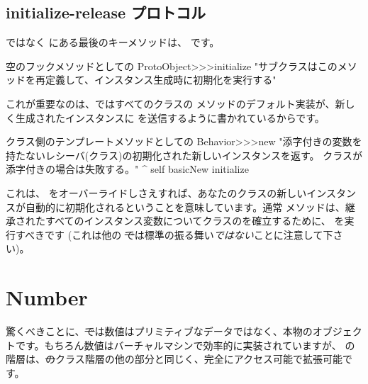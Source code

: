 \documentclass[a4paper,10pt,twoside]{book}
\begin{document}

\subsection{initialize-release プロトコル}

 ではなく  にある最後のキーメソッドは、 です。

\begin{method}{空のフックメソッドとしての }
ProtoObject>>>initialize
   "サブクラスはこのメソッドを再定義して、インスタンス生成時に初期化を実行する"
\end{method}

これが重要なのは、\pharo ではすべてのクラスの  メソッドのデフォルト実装が、新しく生成されたインスタンスに  を送信するように書かれているからです。

\begin{method}{クラス側のテンプレートメソッドとしての }
Behavior>>>new
    "添字付きの変数を持たないレシーバ(クラス)の初期化された新しいインスタンスを返す。
    クラスが添字付きの場合は失敗する。"
    ^ self basicNew initialize
\end{method} %

これは、 をオーバーライドしさえすれば、あなたのクラスの新しいインスタンスが自動的に初期化されるということを意味しています。通常  メソッドは、継承されたすべてのインスタンス変数についてクラスのを確立するために、 を実行すべきです
(これは他の \st では標準の振る舞い\emph{ではない}ことに注意して下さい)。%

\section{Number}
驚くべきことに、\st では数値はプリミティブなデータではなく、本物のオブジェクトです。もちろん数値はバーチャルマシンで効率的に実装されていますが、 の階層は、\st のクラス階層の他の部分と同じく、完全にアクセス可能で拡張可能です。
\end{document}
